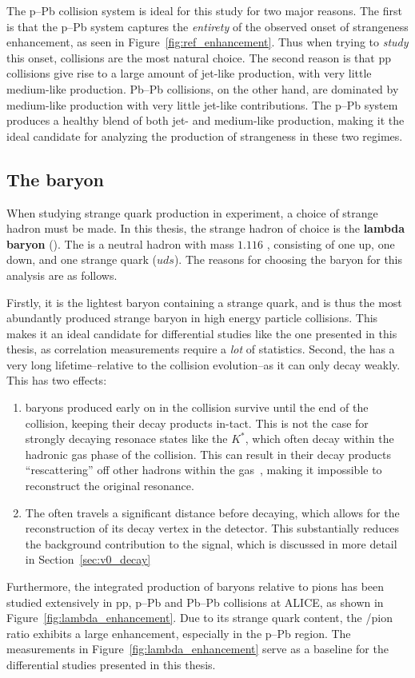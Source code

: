 The p--Pb collision system is ideal for this study for two major reasons. The first is that the p--Pb system captures the \textit{entirety} of the observed onset of strangeness enhancement, as seen in Figure~\ref{fig:ref_enhancement}. Thus when trying to \textit{study} this onset, \pPb collisions are the most natural choice. The second reason is that pp collisions give rise to a large amount of jet-like production, with very little medium-like production. Pb--Pb collisions, on the other hand, are dominated by medium-like production with very little jet-like contributions. The p--Pb system produces a healthy blend of both jet- and medium-like production, making it the ideal candidate for analyzing the production of strangeness in these two regimes.

\subsection{The \lmb baryon}
\label{sec:lambda_baryon}

When studying strange quark production in experiment, a choice of strange hadron must be made. In this thesis, the strange hadron of choice is the \textbf{lambda baryon} (\lmb). The \lmb is a neutral hadron with mass $1.116$ \GeVmass, consisting of one up, one down, and one strange quark ($uds$). The reasons for choosing the \lmb baryon for this analysis are as follows.

Firstly, it is the lightest baryon containing a strange quark, and is thus the most abundantly produced strange baryon in high energy particle collisions. This makes it an ideal candidate for differential studies like the one presented in this thesis, as correlation measurements require a \textit{lot} of statistics. Second, the \lmb has a very long lifetime--relative to the collision evolution--as it can only decay weakly. This has two effects:
\begin{enumerate}
    \item \lmb baryons produced early on in the collision survive until the end of the collision, keeping their decay products in-tact. This is not the case for strongly decaying resonace states like the $K^*$, which often decay within the hadronic gas phase of the collision. This can result in their decay products ``rescattering'' off other hadrons within the gas~\cite{Rescatter}, making it impossible to reconstruct the original resonance.
    \item The \lmb often travels a significant distance before decaying, which allows for the reconstruction of its decay vertex in the detector. This substantially reduces the background contribution to the \lmb signal, which is discussed in more detail in Section~\ref{sec:v0_decay}
\end{enumerate}
Furthermore, the integrated production of \lmb baryons relative to pions has been studied extensively in pp, p--Pb and Pb--Pb collisions at ALICE, as shown in Figure~\ref{fig:lambda_enhancement}. Due to its strange quark content, the \lmb/pion ratio exhibits a large enhancement, especially in the p--Pb region. The measurements in Figure~\ref{fig:lambda_enhancement} serve as a baseline for the differential studies presented in this thesis.

